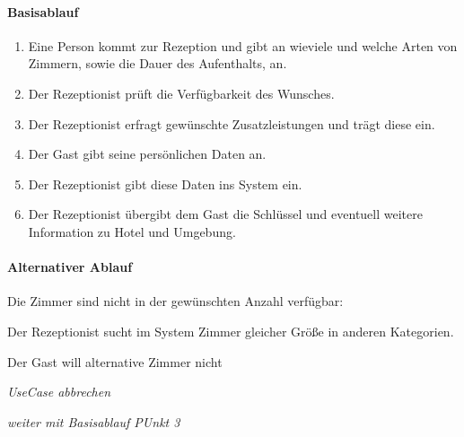 \paragraph{Basisablauf}
\begin{enumerate}
	\item Eine Person kommt zur \Gls{Rezeption} und gibt an wieviele und welche Arten von \Gls{Zimmer}n, sowie die Dauer des Aufenthalts, an.
	\item Der \Gls{Rezeptionist} prüft die Verfügbarkeit des Wunsches.
	\item Der \Gls{Rezeptionist} erfragt gewünschte \Gls{Zusatzleistung}en und trägt diese ein.
	\item Der \Gls{Gast} gibt seine persönlichen Daten an.
	\item Der \Gls{Rezeptionist} gibt diese Daten ins System ein.
	\item Der \Gls{Rezeptionist} übergibt dem \Gls{Gast} die Schlüssel und eventuell weitere Information zu Hotel und Umgebung.
\end{enumerate}

\paragraph{Alternativer Ablauf}
\begin{longenum}
	\item
	\item
	\begin{longenum}
		\item Die \Gls{Zimmer} sind nicht in der gewünschten Anzahl verfügbar:
		\begin{longenum}
			\item Der \Gls{Rezeptionist} sucht im System Zimmer gleicher Größe in anderen Kategorien.
			\begin{longenum}
				\item Der \Gls{Gast} will alternative Zimmer nicht
				\begin{longenum}
					\item \emph{UseCase abbrechen}
				\end{longenum}
			\end{longenum}
			\item \emph{weiter mit Basisablauf PUnkt 3}
		\end{longenum}
	\end{longenum}
	\item
	\item
	\item
	\item
\end{longenum}

